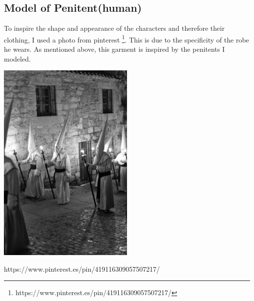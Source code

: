 \documentclass[12pt,a4paper,titlepage,final,tikz,border=4mm]{report}
\begin{document}
\subsection{Model of Penitent(human)}
To inspire the shape and appearance of the characters and therefore their clothing, I used a photo from pinterest \footnote {https://www.pinterest.es/pin/419116309057507217/}. This is due to the specificity of the robe he wears. As mentioned above, this garment is inspired by the penitents I modeled.
\begin {center}
\includegraphics [height = 10cm] {předloha.jpg}
\caption {https://www.pinterest.es/pin/419116309057507217/}
\end {center}
\end{document}
